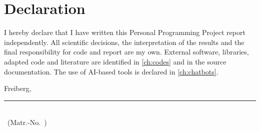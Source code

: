 \chapter*{Declaration}

I hereby declare that I have written this Personal Programming Project report
independently. All scientific decisions, the interpretation of the results and
the final responsibility for code and report are my own. External software,
libraries, adapted code and literature are identified in
\cref{ch:codes} and in the source documentation. The use of AI-based tools is
declared in \cref{ch:chatbots}.

\vspace{2.5cm}
\noindent Freiberg, \SubmissionDate\hfill\rule{6cm}{0.4pt}\\
\hspace*{\fill}\ReportAuthor\ (Matr.-No.\ \MatriculationNumber)
